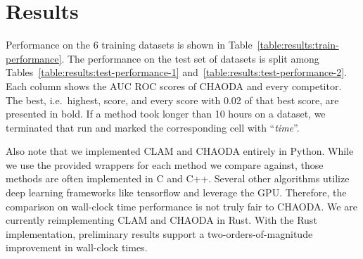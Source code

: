 \section{Results}
\label{sec:results}

Performance on the 6 training datasets is shown in Table~\ref{table:results:train-performance}.
The performance on the test set of datasets is split among Tables~\ref{table:results:test-performance-1} and~\ref{table:results:test-performance-2}.
Each column shows the AUC ROC scores of CHAODA and every competitor.
The best, i.e.\ highest, score, and every score with 0.02 of that best score, are presented in bold.
If a method took longer than 10 hours on a dataset, we terminated that run and marked the corresponding cell with ``\textit{time}''.

Also note that we implemented CLAM and CHAODA entirely in Python.
While we use the provided wrappers for each method we compare against, those methods are often implemented in C and C++.
Several other algorithms utilize deep learning frameworks like tensorflow and leverage the GPU.
Therefore, the comparison on wall-clock time performance is not truly fair to CHAODA.
We are currently reimplementing CLAM and CHAODA in Rust.
With the Rust implementation, preliminary results support a two-orders-of-magnitude improvement in wall-clock times.




